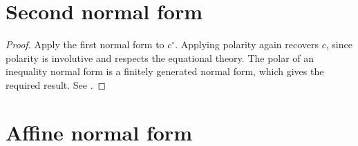 \section{Second normal form}\label{appendix:gpa-proof-6}

\begin{proof}
    Apply the first normal form to $c^\circ$. Applying polarity again
    recovers $c$, since polarity is involutive and respects the
    equational theory. The polar of an inequality normal form is a
    finitely generated normal form, which gives the required result.
    See \cite[Proposition~17 and Theorem~18]{bonchi2021polyhedral}.
\end{proof}

\section{Affine normal form}\label{appendix:gpa-proof-11}

